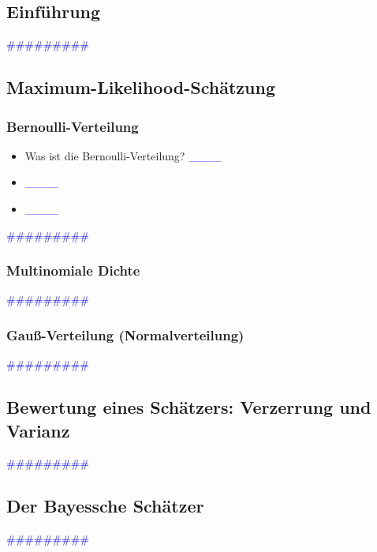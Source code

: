 \documentclass{article}
\begin{document}
  \subsection{Einführung} %
      \textcolor{blue}{\#\#\#\#\#\#\#\#\#}
  \subsection{Maximum-Likelihood-Schätzung} %
    \subsubsection{Bernoulli-Verteilung} %
      \begin{itemize}
      \color{red}
        \item Was ist die Bernoulli-Verteilung? \textcolor{blue}{\_\_\_\_}
        \item  \textcolor{blue}{\_\_\_\_}
        \item  \textcolor{blue}{\_\_\_\_}
      \end{itemize}    
      \textcolor{blue}{\#\#\#\#\#\#\#\#\#}
    \subsubsection{Multinomiale Dichte} %
      \textcolor{blue}{\#\#\#\#\#\#\#\#\#}
    \subsubsection{Gauß-Verteilung (Normalverteilung)} %
      \textcolor{blue}{\#\#\#\#\#\#\#\#\#}
  \subsection{Bewertung eines Schätzers: Verzerrung und Varianz} %
      \textcolor{blue}{\#\#\#\#\#\#\#\#\#}
  \subsection{Der Bayessche Schätzer} %
      \textcolor{blue}{\#\#\#\#\#\#\#\#\#}
\end{document}
